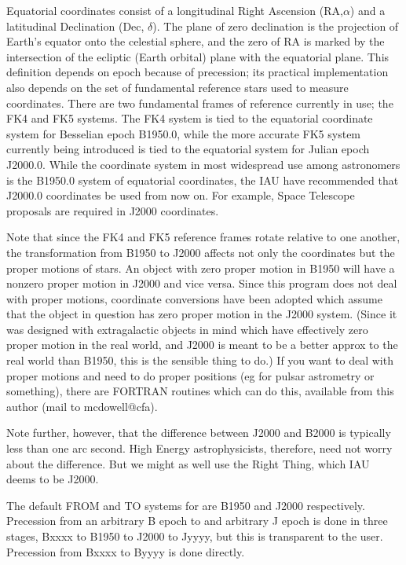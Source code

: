 Equatorial coordinates consist of a longitudinal Right Ascension (RA,$\alpha$) and 
a latitudinal Declination
(Dec, $\delta$). The plane of zero declination is the projection of 
Earth's equator onto the celestial sphere, and the zero of RA is marked
by the intersection of the ecliptic (Earth orbital) plane with the equatorial
plane. This definition depends on epoch because of precession; its practical 
implementation also depends on the set of fundamental reference stars used
to measure coordinates. There are two fundamental frames of reference
currently in use; the FK4 and FK5 systems. The FK4 system is tied
to the equatorial coordinate system for Besselian epoch B1950.0, while
the more accurate FK5 system currently
being introduced is tied to the equatorial system for Julian epoch J2000.0.
While the coordinate system in most widespread use among astronomers is the B1950.0 system
of equatorial coordinates, the IAU have recommended that J2000.0 coordinates be used
from now on. For example, Space Telescope proposals are required in J2000 coordinates.

Note that since the FK4 and FK5 reference frames rotate relative to one another,
the transformation from B1950 to J2000 affects not only the coordinates but
the proper motions of stars. An object with zero proper motion in B1950 will
have a nonzero proper motion in J2000 and vice versa. Since this program does not deal with 
proper motions, coordinate conversions have been adopted which assume that
the object in question has zero proper motion in the J2000 system.  (Since
it was designed with extragalactic objects in mind which have effectively
zero proper motion in the real world, and J2000 is meant to be a better approx
to the real world than B1950, this is the sensible thing to do.) If you want to
deal with proper motions and need to do proper positions (eg for pulsar
astrometry or something), there are FORTRAN routines which can do this, available
from this author (mail to mcdowell@cfa). 

Note further, however, that the difference between J2000 and B2000 is typically
less than one arc second. High Energy astrophysicists, therefore, need not worry
about the difference. But we might as well use the Right Thing, which IAU deems
to be J2000.

The default FROM and TO systems for \pr are B1950 and J2000 respectively.
Precession from an arbitrary B epoch to and arbitrary J epoch is done 
in three stages, Bxxxx to B1950 to J2000 to Jyyyy, but this is transparent to
the user. Precession from Bxxxx to Byyyy is done directly.

